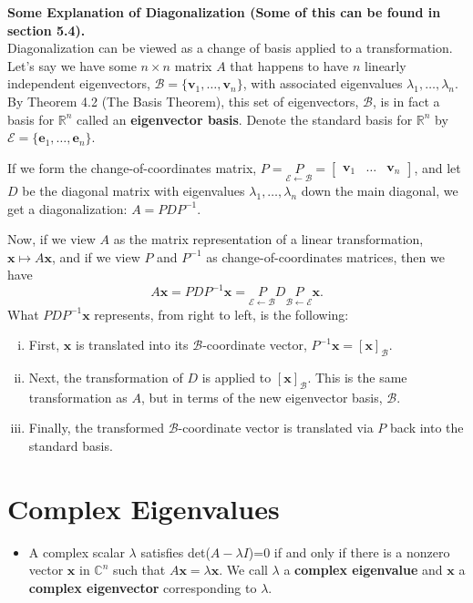 \documentclass[10pt]{book}
\newenvironment{boxdef}{\begin{mdframed}[backgroundcolor=gray!30,linewidth=0pt,nobreak=true]}{\end{mdframed}}
\newcommand{\R}{\mathbb{R}}
\newcommand{\B}{\mathscr{B}}
\newcommand{\E}{\mathscr{E}}
\newcommand{\vect}[1]{\ensuremath{\boldsymbol{\mathbf{#1}}}}
\newcommand{\ve}[1]{\vect{e}_{#1}}
\newcommand{\vectB}[1][x]{[\vect{#1}]_\B}
\newcommand{\CoC}[2]{\underset{#2\leftarrow #1}{P}}
\begin{document}
\begin{boxdef}
	\textbf{Some Explanation of Diagonalization (Some of this can be found in section 5.4).} \\
	Diagonalization can be viewed as a change of basis applied to a transformation. Let's say we have some $n\times n$ matrix $A$ that happens to have $n$ linearly independent eigenvectors, $\B=\{\vect{v}_1,\ldots,\vect{v}_n\}$, with associated eigenvalues $\lambda_1,\ldots,\lambda_n$. By Theorem 4.2 (The Basis Theorem), this set of eigenvectors, $\B$, is in fact a basis for $\R^n$ called an \textbf{eigenvector basis}. Denote the standard basis for $\R^n$ by $\E=\{\ve1,\ldots,\ve{n}\}$.
	
	If we form the change-of-coordinates matrix, $P=\CoC{\B}{\E}=\begin{bmatrix}\vect{v}_1&\ldots&\vect{v}_n\end{bmatrix}$, and let $D$ be the diagonal matrix with eigenvalues $\lambda_1,\ldots,\lambda_n$ down the main diagonal, we get a diagonalization: $ A = PDP^{-1}. $
	
	Now, if we view $A$ as the matrix representation of a linear transformation, $\vect{x}\mapsto A\vect{x}$, and if we view $P$ and $P^{-1}$ as change-of-coordinates matrices, then we have \vspace{-1ex}
	$$ A\vect{x} = PDP^{-1}\vect{x} = \CoC{\B}{\E}D\CoC{\E}{\B}\vect{x}.$$
	What $PDP^{-1}\vect{x}$ represents, from right to left, is the following:
	\begin{enumerate}[(i)]
		\item First, $\vect{x}$ is translated into its $\B$-coordinate vector, $P^{-1}\vect{x}=\vectB[x]$.
		\item Next, the transformation of $D$ is applied to $\vectB[x]$. This is the same transformation as $A$, but in terms of the new eigenvector basis, $\B$.
		\item Finally, the transformed $\B$-coordinate vector is translated via $P$ back into the standard basis.
	\end{enumerate}
\end{boxdef}

\setcounter{section}{4}
\section{Complex Eigenvalues}
\begin{itemize}
\item A complex scalar $\lambda$ satisfies det($A-\lambda I$)=0 if and only if there is a nonzero vector $\vect{x}$ in $\mathbb{C}^n$ such that $A\vect{x}=\lambda \vect{x}$.  We call $\lambda$ a \textbf{complex eigenvalue} and $\vect{x}$ a \textbf{complex eigenvector} corresponding to $\lambda$.
\end{itemize}
\end{document}

